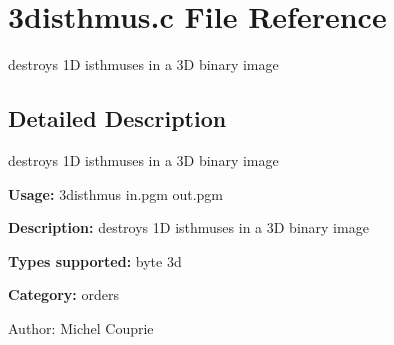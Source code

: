 \section{3disthmus.c File Reference}
\label{3disthmus_8c}
destroys 1D isthmuses in a 3D binary image 



\subsection{Detailed Description}
destroys 1D isthmuses in a 3D binary image 

{\bf Usage:} 3disthmus in.pgm out.pgm

{\bf Description:} destroys 1D isthmuses in a 3D binary image

{\bf Types supported:} byte 3d

{\bf Category:} orders

\begin{Desc}
\item[Author:]Michel Couprie \end{Desc}
